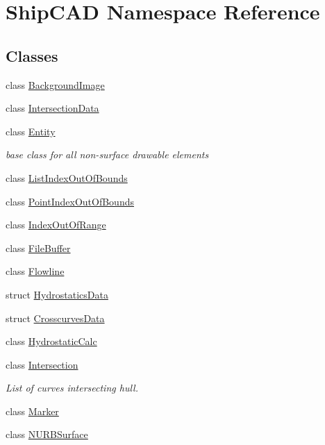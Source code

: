 \hypertarget{namespaceShipCAD}{\section{Ship\-C\-A\-D Namespace Reference}
\label{namespaceShipCAD}
}
\subsection*{Classes}
\begin{DoxyCompactItemize}
\item 
class \hyperlink{classShipCAD_1_1BackgroundImage}{Background\-Image}
\item 
class \hyperlink{classShipCAD_1_1IntersectionData}{Intersection\-Data}
\item 
class \hyperlink{classShipCAD_1_1Entity}{Entity}
\begin{DoxyCompactList}\small\item\em base class for all non-\/surface drawable elements \end{DoxyCompactList}\item 
class \hyperlink{classShipCAD_1_1ListIndexOutOfBounds}{List\-Index\-Out\-Of\-Bounds}
\item 
class \hyperlink{classShipCAD_1_1PointIndexOutOfBounds}{Point\-Index\-Out\-Of\-Bounds}
\item 
class \hyperlink{classShipCAD_1_1IndexOutOfRange}{Index\-Out\-Of\-Range}
\item 
class \hyperlink{classShipCAD_1_1FileBuffer}{File\-Buffer}
\item 
class \hyperlink{classShipCAD_1_1Flowline}{Flowline}
\item 
struct \hyperlink{structShipCAD_1_1HydrostaticsData}{Hydrostatics\-Data}
\item 
struct \hyperlink{structShipCAD_1_1CrosscurvesData}{Crosscurves\-Data}
\item 
class \hyperlink{classShipCAD_1_1HydrostaticCalc}{Hydrostatic\-Calc}
\item 
class \hyperlink{classShipCAD_1_1Intersection}{Intersection}
\begin{DoxyCompactList}\small\item\em List of curves intersecting hull. \end{DoxyCompactList}\item 
class \hyperlink{classShipCAD_1_1Marker}{Marker}
\item 
class \hyperlink{classShipCAD_1_1NURBSurface}{N\-U\-R\-B\-Surface}
\item 

\end{DoxyCompactItemize}

